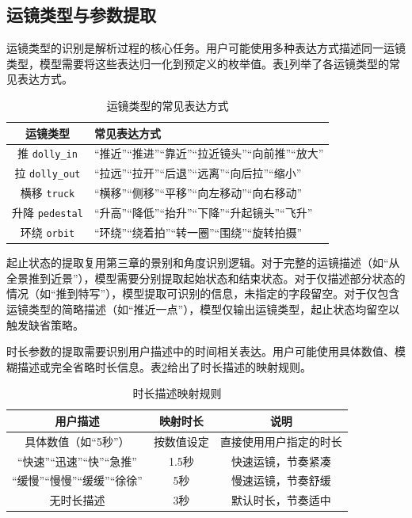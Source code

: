 \subsection{运镜类型与参数提取}

运镜类型的识别是解析过程的核心任务。用户可能使用多种表达方式描述同一运镜类型，模型需要将这些表达归一化到预定义的枚举值。表\ref{tab:movement_expression}列举了各运镜类型的常见表达方式。

\begin{table}[htbp]
\centering
\caption{运镜类型的常见表达方式}
\label{tab:movement_expression}
\begin{tabular}{cp{10cm}}
\toprule
运镜类型 & 常见表达方式 \\
\midrule
推 \texttt{dolly\_in} & “推近”“推进”“靠近”“拉近镜头”“向前推”“放大” \\
拉 \texttt{dolly\_out} & “拉远”“拉开”“后退”“远离”“向后拉”“缩小” \\
横移 \texttt{truck} & “横移”“侧移”“平移”“向左移动”“向右移动” \\
升降 \texttt{pedestal} & “升高”“降低”“抬升”“下降”“升起镜头”“飞升” \\
环绕 \texttt{orbit} & “环绕”“绕着拍”“转一圈”“围绕”“旋转拍摄” \\
\bottomrule
\end{tabular}
\end{table}

起止状态的提取复用第三章的景别和角度识别逻辑。对于完整的运镜描述（如“从全景推到近景”），模型需要分别提取起始状态和结束状态。对于仅描述部分状态的情况（如“推到特写”），模型提取可识别的信息，未指定的字段留空。对于仅包含运镜类型的简略描述（如“推近一点”），模型仅输出运镜类型，起止状态均留空以触发缺省策略。

时长参数的提取需要识别用户描述中的时间相关表达。用户可能使用具体数值、模糊描述或完全省略时长信息。表\ref{tab:duration_mapping}给出了时长描述的映射规则。

\begin{table}[htbp]
\centering
\caption{时长描述映射规则}
\label{tab:duration_mapping}
\begin{tabular}{ccc}
\toprule
用户描述 & 映射时长 & 说明 \\
\midrule
具体数值（如“5秒”） & 按数值设定 & 直接使用用户指定的时长 \\
“快速”“迅速”“快”“急推” & 1.5秒 & 快速运镜，节奏紧凑 \\
“缓慢”“慢慢”“缓缓”“徐徐” & 5秒 & 慢速运镜，节奏舒缓 \\
无时长描述 & 3秒 & 默认时长，节奏适中 \\
\bottomrule
\end{tabular}
\end{table}


